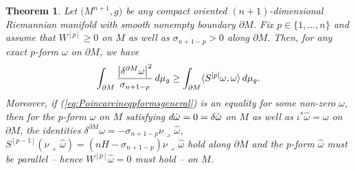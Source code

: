 \documentclass[11pt]{article}
\numberwithin{equation}{section}
\numberwithin{equation}{section}
\newtheorem{Theorem}{Theorem}[section]
\begin{document}
\begin{Theorem}\label{t:Poincareineqpformsgeneral}
Let $\bigl(M^{n+1},g\bigr)$ be any compact oriented  $(n+1)$-dimensional Riemannian manifold with smooth nonempty boundary $\partial M$.
Fix $p\in\{1,\dots,n\}$ and assume that $W^{[p]}\geq0$ on $M$ as well as $\sigma_{n+1-p}>0$ along $\partial M$.
Then, for any exact $p$-form $\omega$ on $\partial M$,  we have
\begin{equation}\label{eq:Poincareineqpformsgeneral}
\int_{\partial M}\frac{\bigl|\delta^{\partial M}\omega\bigr|^2}{\sigma_{n+1-p}}\,{\rm d}\mu_g\geq\int_{\partial M}\langle S^{[p]}\omega,\omega\rangle\,{\rm d}\mu_g.
\end{equation}
Moreover, if {\rm (\ref{eq:Poincareineqpformsgeneral})} is an equality for some non-zero $\omega$, then for the $p$-form $\hat{\omega}$ on $M$ satisfying ${\rm d}\hat{\omega}=0=\delta\hat{\omega}$ on $M$ as well as $\iota^*\hat{\omega}=\omega$ on $\partial M$, the identities $\delta^{\partial M}\omega=-\sigma_{n+1-p}\nu\lrcorner\,\hat{\omega}$, $S^{[p-1]}(\nu\lrcorner\,\hat{\omega})=(nH-\sigma_{n+1-p})\nu\lrcorner\,\hat{\omega}$ hold along $\partial M$ and the $p$-form $\hat{\omega}$ must be parallel -- hence $W^{[p]}\hat{\omega}=0$ must hold -- on $M$.
\end{Theorem}
\end{document}
